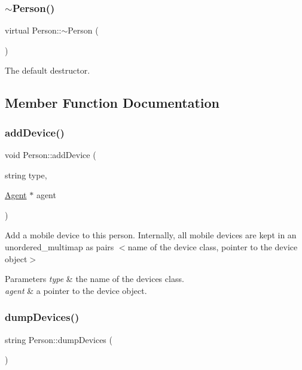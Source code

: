 \subsubsection{\texorpdfstring{$\sim$\+Person()}{~Person()}}
{\footnotesize\ttfamily virtual Person\+::$\sim$\+Person (\begin{DoxyParamCaption}{ }\end{DoxyParamCaption})\hspace{0.3cm}{\ttfamily [virtual]}}

The default destructor. 

\subsection{Member Function Documentation}
\mbox{\label{class_person_a3ce0a72a98c2e723e48dcd7b4d9af599}} 
\subsubsection{\texorpdfstring{add\+Device()}{addDevice()}}
{\footnotesize\ttfamily void Person\+::add\+Device (\begin{DoxyParamCaption}\item[{string}]{type,  }\item[{\hyperlink{class_agent}{Agent} $\ast$}]{agent }\end{DoxyParamCaption})}

Add a mobile device to this person. Internally, all mobile devices are kept in an unordered\+\_\+multimap as pairs $<$name of the device class, pointer to the device object$>$ 
\begin{DoxyParams}{Parameters}
{\em type} & the name of the device\textquotesingle{}s class. \\
\hline
{\em agent} & a pointer to the device object. \\
\hline
\end{DoxyParams}
\mbox{\label{class_person_a0bc06f77b3e8a151f8c5cc77459895c9}} 
\subsubsection{\texorpdfstring{dump\+Devices()}{dumpDevices()}}
{\footnotesize\ttfamily string Person\+::dump\+Devices (\begin{DoxyParamCaption}{ }\end{DoxyParamCaption})}


